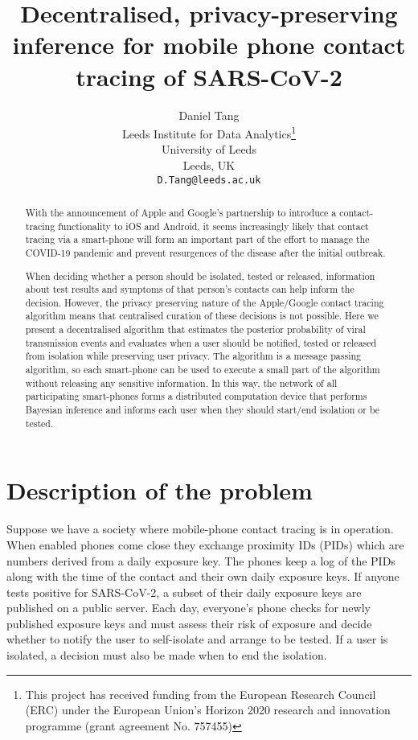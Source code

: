 \documentclass{article}
\title{Decentralised, privacy-preserving inference for mobile phone contact tracing of SARS-CoV-2}
\author{
  Daniel Tang\\
  Leeds Institute for Data Analytics\thanks{This project has received funding from the European Research Council (ERC) under the European Union’s Horizon 2020 research and innovation programme (grant agreement No. 757455)}\\
  University of Leeds\\
  Leeds, UK\\
  \texttt{D.Tang@leeds.ac.uk} \\
}
\begin{document}
\maketitle

\begin{abstract}
With the announcement of Apple and Google's partnership to introduce a contact-tracing functionality to iOS and Android, it seems increasingly likely that contact tracing via a smart-phone will form an important part of the effort to manage the COVID-19 pandemic and prevent resurgences of the disease after the initial outbreak.

When deciding whether a person should be isolated, tested or released, information about test results and symptoms of that person's contacts can help inform the decision. However, the privacy preserving nature of the Apple/Google contact tracing algorithm means that centralised curation of these decisions is not possible. Here we present a decentralised algorithm that estimates the posterior probability of viral transmission events and evaluates when a user should be notified, tested or released from isolation while preserving user privacy. The algorithm is a message passing algorithm, so each smart-phone can be used to execute a small part of the algorithm without releasing any sensitive information. In this way, the network of all participating smart-phones forms a distributed computation device that performs Bayesian inference and informs each user when they should start/end isolation or be tested. 

\end{abstract}


\section{Description of the problem}

Suppose we have a society where mobile-phone contact tracing is in operation. When enabled phones come close they exchange proximity IDs (PIDs) which are numbers derived from a daily exposure key. The phones keep a log of the PIDs along with the time of the contact and their own daily exposure keys. If anyone tests positive for SARS-CoV-2, a subset of their daily exposure keys are published on a public server. Each day, everyone's phone checks for newly published exposure keys and must assess their risk of exposure and decide whether to notify the user to self-isolate and arrange to be tested. If a user is isolated, a decision must also be made when to end the isolation.
\end{document}
